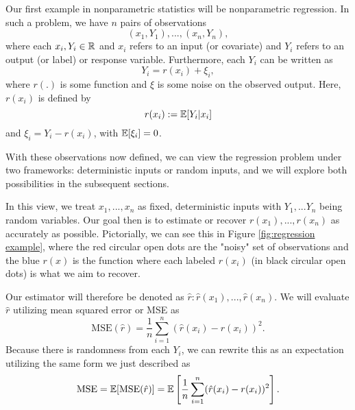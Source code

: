 Our first example in nonparametric statistics will be nonparametric regression. In such a problem, we have $n$ pairs of observations
\begin{equation} 
(x_1, Y_1), ..., (x_n, Y_n),
\end{equation}
 where each $x_i, Y_i \in \mathbb R$ and $x_i$ refers to an input (or covariate) and $Y_i$ refers to an output (or label) or response variable. Furthermore, each $Y_i$ can be written as
  \begin{equation} 
  	Y_i = r(x_i) + \xi_i,
   \end{equation} 
where $r(.)$ is some function and $\xi$ is some noise on the observed output. Here, $r(x_i)$ is defined by
 \begin{equation} r(x_i) := \operatorname*{\mathbb{E}}[Y_i | x_i]
 \end{equation} 
and $\xi_i = Y_i - r(x_i)$, with $\operatorname*{\mathbb{E}}[\xi_i] = 0$. 

With these observations now defined, we can view the regression problem under two frameworks: deterministic inputs or random inputs, and we will explore both possibilities in the subsequent sections.

In this view, we treat $x_1, ..., x_n$ as fixed, deterministic inputs with $Y_1, ... Y_n$ being random variables. Our goal then is to estimate or recover $r(x_1), ..., r(x_n)$ as accurately as possible. Pictorially, we can see this in Figure \ref{fig:regression example}, where the red circular open dots are the "noisy" set of observations and the blue $r(x)$ is the function where each labeled $r(x_i)$ (in black circular open dots) is what we aim to recover. 

Our estimator will therefore be denoted as $\hat{r}: \hat{r}(x_1), ..., \hat{r}(x_n)$. We will evaluate $\hat{r}$ utilizing mean squared error or MSE as  \begin{equation} \text{MSE}(\hat{r}) = \frac{1}{n} \sum_{i = 1}^{n} (\hat{r}(x_i) - r(x_i))^2.\end{equation} 
Because there is randomness from each $Y_i$, we can rewrite this as an expectation utilizing the same form we just described as
\begin{equation} \text{MSE} = \operatorname*{\mathbb{E}}[\text{MSE}(\hat{r})] = \operatorname*{\mathbb{E}} \left[\frac{1}{n} \sum_{i = 1}^{n} (\hat{r}(x_i) - r(x_i))^2\right].
\end{equation}

